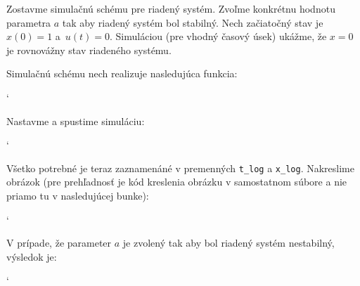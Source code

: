 \documentclass[a4paper, 10pt, ]{article}
\begin{document}
Zostavme simulačnú schému pre riadený systém. Zvoľme konkrétnu hodnotu parametra $a$ tak aby riadený systém bol stabilný. Nech začiatočný stav je $x(0) = 1$ a~$u(t)=0$. Simuláciou (pre vhodný časový úsek) ukážme, že $x = 0$ je rovnovážny stav riadeného systému.

\noindent
Simulačnú schému nech realizuje nasledujúca funkcia:

{\catcode`

}

\noindent
Nastavme a spustime simuláciu:

{\catcode`

}

Všetko potrebné je teraz zaznamenáné v premenných  \lstinline{t_log} a \lstinline{x_log}. Nakreslime obrázok (pre prehľadnosť je kód kreslenia obrázku v samostatnom súbore a nie priamo tu v nasledujúcej bunke):

{\catcode`

}

\begin{centering}


    \vspace{-2mm}

    \figcaption{}

    \vspace{2mm}

    \label{figsc_ar02_fig03_0}

\end{centering}




\noindent
V prípade, že parameter $a$ je zvolený tak aby bol riadený systém nestabilný, výsledok je:



{\catcode`

}
\end{document}
